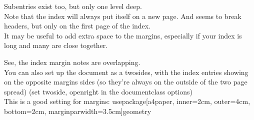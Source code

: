 \documentclass[11pt]{article}
\begin{document}
Subentries exist too, but only one level deep. \\ 


Note that the index will always put itself on a new page. And seems to break headers, but only on the first page of the index. \\


It may be useful to add extra space to the margins, especially if your index is long and many are close together. 

See, the index margin notes are overlapping. \\


You can also set up the document as a twosides, with the index entries showing on the opposite margins sides (so they're always on the outside of the two page spread) (set twoside, openright in the documentclass options) \\

This is a good setting for margins: usepackage[a4paper, inner=2cm, outer=4cm, bottom=2cm, marginparwidth=3.5cm]{geometry}

\printindex
\end{document}
